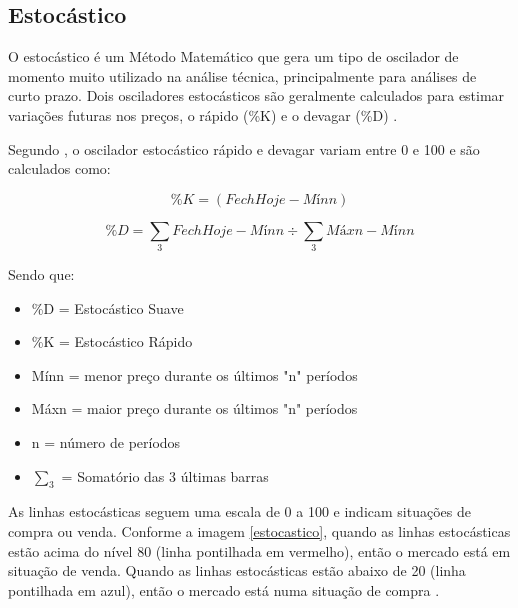 \subsection{Estocástico}
O estocástico é um Método Matemático que gera um tipo de oscilador de momento muito utilizado na análise técnica, principalmente para análises de curto prazo. Dois osciladores estocásticos são geralmente calculados para estimar variações futuras nos preços, o rápido (\%K) e o devagar (\%D) \cite{advfn}.

Segundo , o oscilador estocástico rápido e devagar variam entre 0 e 100 e são calculados como:

\begin{equation}
\%K = (FechHoje - Mínn) %
\end{equation}

\begin{equation}
\%D = \sum_3{FechHoje - Mínn} \div \sum_3{Máxn- Mínn}
\end{equation}

Sendo que:

\begin{itemize}
\item \%D = Estocástico Suave
\item \%K = Estocástico Rápido
\item Mínn = menor preço durante os últimos "n" períodos
\item Máxn = maior preço durante os últimos "n" períodos
\item n = número de períodos
\item $\sum_3$ = Somatório das 3 últimas barras
\end{itemize}

As linhas estocásticas seguem uma escala de 0 a 100 e indicam situações de compra ou venda. Conforme a imagem \ref{estocastico}, quando as linhas estocásticas estão acima do nível 80 (linha pontilhada em vermelho), então o mercado está em situação de venda. Quando as linhas estocásticas estão abaixo de 20 (linha pontilhada em azul), então o mercado está numa situação de compra \cite{investforex}.

